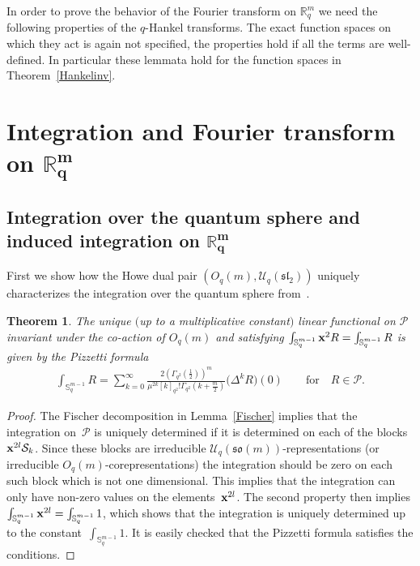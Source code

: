 \documentclass[11pt]{article}
\newtheorem{theorem}{Theorem}
\newcommand{\mR}{\mathbb{R}}
\newcommand{\mS}{\mathbb{S}}
\newcommand{\cP}{\mathcal{P}}
\newcommand{\cS}{\mathcal{S}}
\newcommand{\cU}{\mathcal{U}}
\numberwithin{equation}{section}
\begin{document}
In order to prove the behavior of the Fourier transform on $\mR^m_q$ we need the following properties of the $q$-Hankel transforms. The exact function spaces on which they act is again not specif\/ied, the properties hold if all the terms are well-def\/ined. In particular these lemmata hold for the function spaces in Theorem~\ref{Hankelinv}.

\setcounter{section}{3}
\setcounter{subsection}{0}
\setcounter{subsubsection}{0}
\setcounter{equation}{2}
\setcounter{lemma}{4}
\section[Integration and Fourier transform on $\mR^m_q$]{Integration and Fourier transform on $\boldsymbol{\mR^m_q}$}

\subsection[Integration over the quantum sphere and induced integration on $\mR^m_q$]{Integration over the quantum sphere and induced integration on $\boldsymbol{\mR^m_q}$}
\label{DefFourier}

First we show how the Howe dual pair $(O_q(m),\cU_q(\mathfrak{sl}_2))$ uniquely characterizes the integration over the quantum sphere from~\cite{MR1408120}.

\begin{theorem}
\label{Pizzth}
The unique $($up to a multiplicative constant$)$ linear functional on $\cP$ invariant under the co-action of $O_q(m)$ and satisfying $\int_{\mS^{m-1}_q}\bold{x}^2R=\int_{\mS^{m-1}_q}R$ is given by the Pizzetti formula
\begin{gather*}
\int_{\mS^{m-1}_q}R= \sum_{k=0}^\infty\frac{2\left(\Gamma_{q^2}(\frac{1}{2})\right)^{m}}{\mu^{2k}[k]_{q^2}!
\Gamma_{q^2}(k+\frac{m}{2})}\big(\Delta^kR\big)(0)\qquad\mbox{for}\quad R\in\cP.
\end{gather*}
\end{theorem}

\begin{proof}
The Fischer decomposition in Lemma~\ref{Fischer} implies that the integration on~$\cP$ is uniquely determined if it is determined on each of the blocks $\bold{x}^{2l}\cS_k$. Since these blocks are irreducible $\cU_q(\mathfrak{so}(m))$-representations (or irreducible $O_q(m)$-corepresentations) the integration should be zero on each such block which is not one dimensional. This implies that the integration can only have non-zero values on the elements~$\bold{x}^{2l}$. The second property then implies $\int_{\mS^{m-1}_q}\bold{x}^{2l}=\int_{\mS^{m-1}_q}1$, which shows that the integration is uniquely determined up to the constant~$\int_{\mS^{m-1}_q}1$. It is easily checked that the Pizzetti formula satisf\/ies the conditions.
\end{proof}
\end{document}
